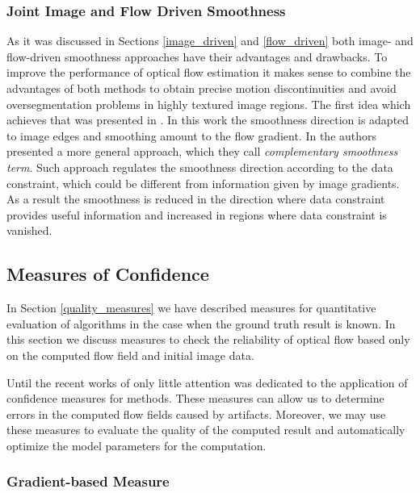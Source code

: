 \subsubsection{Joint Image and Flow Driven Smoothness}
\label{image_flow_smoothness}


As it was discussed in Sections \ref{image_driven} and \ref{flow_driven} both image- and flow-driven smoothness approaches have their advantages and drawbacks. To improve the performance of optical flow estimation it makes sense to combine the advantages of both methods to obtain precise motion discontinuities and avoid oversegmentation problems in highly textured image regions. 
The first idea which achieves that was presented in \cite{Sun08}. In this work the smoothness direction is adapted to image edges and smoothing amount to the flow gradient. In \cite{HarmonyFlow} the authors presented a more general approach, which they call \textit{complementary smoothness term}.  Such approach regulates the smoothness direction according to the data constraint, which could be different from information given by image gradients. As a result the smoothness is reduced in the direction where data constraint provides useful information and increased in regions where data constraint is vanished.  





\subsection{Measures of Confidence}
\label{confidence_measures}

In Section \ref{quality_measures} we have described measures for quantitative evaluation of \opticalflow algorithms in the case when the ground truth result is known. In this section we discuss measures to check the reliability of optical flow based only on the computed flow field and initial image data. 
     
Until the recent works of \cite{Sun10, HarmonyFlow} only little attention was dedicated to the application of confidence measures for \opticalflow methods.  
These measures can allow us to determine errors in the computed flow fields caused by artifacts. Moreover, we may use these measures to evaluate the quality of the computed result and automatically optimize the model parameters for the \opticalflow computation.  


\subsubsection{Gradient-based Measure}

